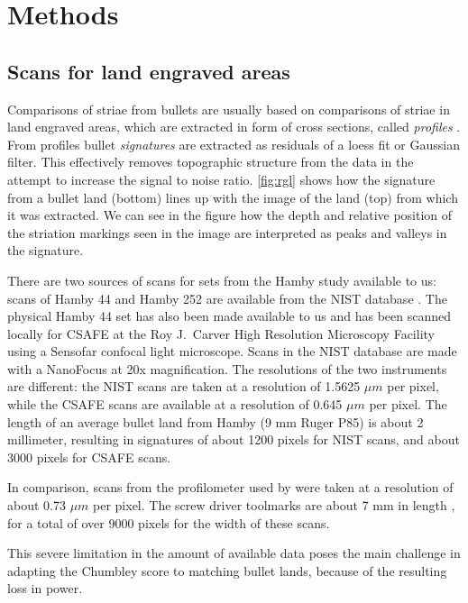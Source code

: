 \documentclass[12pt]{article}
\begin{document}
\section{Methods}\label{methods}

\subsection{Scans for land engraved
areas}\label{scans-for-land-engraved-areas}

Comparisons of striae from bullets are usually based on comparisons of
striae in land engraved areas, which are extracted in form of cross
sections, called \emph{profiles} \citep{aoas,ma2004}. From profiles
bullet \emph{signatures} \citep{chu2013,aoas} are extracted as residuals
of a loess fit or Gaussian filter. This effectively removes topographic
structure from the data in the attempt to increase the signal to noise
ratio. \autoref{fig:rgl} shows how the signature from a bullet land
(bottom) lines up with the image of the land (top) from which it was
extracted. We can see in the figure how the depth and relative position
of the striation markings seen in the image are interpreted as peaks and
valleys in the signature.

There are two sources of scans for sets from the Hamby study available
to us: scans of Hamby 44 and Hamby 252 are available from the NIST
database \citep{nist}. The physical Hamby 44 set has also been made
available to us and has been scanned locally for CSAFE at the Roy
J.~Carver High Resolution Microscopy Facility using a Sensofar confocal
light microscope. Scans in the NIST database are made with a NanoFocus
at 20x magnification. The resolutions of the two instruments are
different: the NIST scans are taken at a resolution of 1.5625 \(\mu m\)
per pixel, while the CSAFE scans are available at a resolution of 0.645
\(\mu m\) per pixel. The length of an average bullet land from Hamby (9
mm Ruger P85) is about 2 millimeter, resulting in signatures of about
1200 pixels for NIST scans, and about 3000 pixels for CSAFE scans.

In comparison, scans from the profilometer used by
\citet{chumbley, hadler} were taken at a resolution of about 0.73
\(\mu m\) per pixel. The screw driver toolmarks are about 7 mm in length
\citep{manytoolmarks1}, for a total of over 9000 pixels for the width of
these scans.

This severe limitation in the amount of available data poses the main
challenge in adapting the Chumbley score to matching bullet lands,
because of the resulting loss in power.
\end{document}
